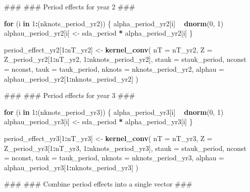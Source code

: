 \documentclass[11pt,]{article}
\newenvironment{Shaded}{\begin{snugshade}}{\end{snugshade}}
\newcommand{\KeywordTok}[1]{\textcolor[rgb]{0.13,0.29,0.53}{\textbf{#1}}}
\newcommand{\DataTypeTok}[1]{\textcolor[rgb]{0.13,0.29,0.53}{#1}}
\newcommand{\DecValTok}[1]{\textcolor[rgb]{0.00,0.00,0.81}{#1}}
\newcommand{\StringTok}[1]{\textcolor[rgb]{0.31,0.60,0.02}{#1}}
\newcommand{\ControlFlowTok}[1]{\textcolor[rgb]{0.13,0.29,0.53}{\textbf{#1}}}
\newcommand{\OperatorTok}[1]{\textcolor[rgb]{0.81,0.36,0.00}{\textbf{#1}}}
\newcommand{\NormalTok}[1]{#1}
\begin{document}
\begin{Shaded}
\begin{Highlighting}[]
\NormalTok{  ###}
\NormalTok{  ### Period effects for year 2}
\NormalTok{  ###}

  \ControlFlowTok{for}\NormalTok{ (i }\ControlFlowTok{in} \DecValTok{1}\OperatorTok{:}\NormalTok{(nknots_period_yr2)) \{}
\NormalTok{    alpha_period_yr2[i] }\OperatorTok{~}\StringTok{ }\KeywordTok{dnorm}\NormalTok{(}\DecValTok{0}\NormalTok{, }\DecValTok{1}\NormalTok{)}
\NormalTok{    alphau_period_yr2[i] <-}\StringTok{ }\NormalTok{sda_period }\OperatorTok{*}\StringTok{ }\NormalTok{alpha_period_yr2[i]}
\NormalTok{  \}}

\NormalTok{  period_effect_yr2[}\DecValTok{1}\OperatorTok{:}\NormalTok{nT_yr2] <-}\StringTok{ }\KeywordTok{kernel_conv}\NormalTok{(}
    \DataTypeTok{nT =}\NormalTok{ nT_yr2,}
    \DataTypeTok{Z =}\NormalTok{ Z_period_yr2[}\DecValTok{1}\OperatorTok{:}\NormalTok{nT_yr2, }\DecValTok{1}\OperatorTok{:}\NormalTok{nknots_period_yr2],}
    \DataTypeTok{stauk =}\NormalTok{ stauk_period,}
    \DataTypeTok{nconst =}\NormalTok{ nconst,}
    \DataTypeTok{tauk =}\NormalTok{ tauk_period,}
    \DataTypeTok{nknots =}\NormalTok{ nknots_period_yr2,}
    \DataTypeTok{alphau =}\NormalTok{ alphau_period_yr2[}\DecValTok{1}\OperatorTok{:}\NormalTok{nknots_period_yr2]}
\NormalTok{  )}

\NormalTok{  ###}
\NormalTok{  ### Period effects for year 3}
\NormalTok{  ###}

  \ControlFlowTok{for}\NormalTok{ (i }\ControlFlowTok{in} \DecValTok{1}\OperatorTok{:}\NormalTok{(nknots_period_yr3)) \{}
\NormalTok{    alpha_period_yr3[i] }\OperatorTok{~}\StringTok{ }\KeywordTok{dnorm}\NormalTok{(}\DecValTok{0}\NormalTok{, }\DecValTok{1}\NormalTok{)}
\NormalTok{    alphau_period_yr3[i] <-}\StringTok{ }\NormalTok{sda_period }\OperatorTok{*}\StringTok{ }\NormalTok{alpha_period_yr3[i]}
\NormalTok{  \}}

\NormalTok{  period_effect_yr3[}\DecValTok{1}\OperatorTok{:}\NormalTok{nT_yr3] <-}\StringTok{ }\KeywordTok{kernel_conv}\NormalTok{(}
    \DataTypeTok{nT =}\NormalTok{ nT_yr3,}
    \DataTypeTok{Z =}\NormalTok{ Z_period_yr3[}\DecValTok{1}\OperatorTok{:}\NormalTok{nT_yr3, }\DecValTok{1}\OperatorTok{:}\NormalTok{nknots_period_yr3],}
    \DataTypeTok{stauk =}\NormalTok{ stauk_period,}
    \DataTypeTok{nconst =}\NormalTok{ nconst,}
    \DataTypeTok{tauk =}\NormalTok{ tauk_period,}
    \DataTypeTok{nknots =}\NormalTok{ nknots_period_yr3,}
    \DataTypeTok{alphau =}\NormalTok{ alphau_period_yr3[}\DecValTok{1}\OperatorTok{:}\NormalTok{nknots_period_yr3]}
\NormalTok{  )}

\NormalTok{  ###}
\NormalTok{  ### Combine period effects into a single vector}
\NormalTok{  ###}


\end{Highlighting}
\end{Shaded}
\end{document}

